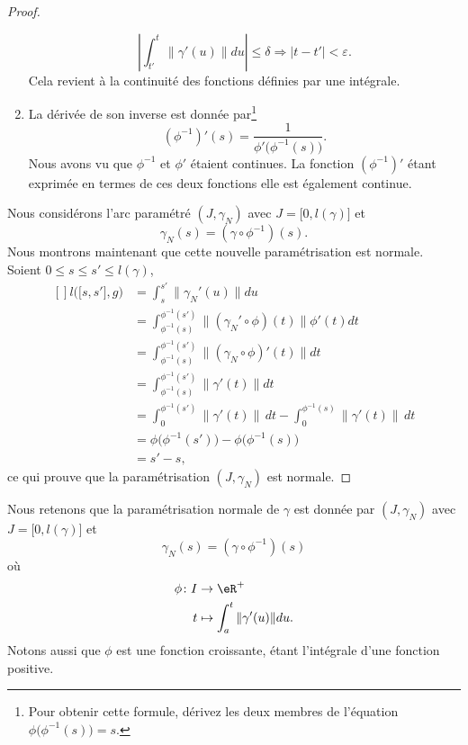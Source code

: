 \begin{proof}
\begin{enumerate}
\begin{equation}
            |   \int_{t'}^t\big\| \gamma'(u) \big\|du  |\leq\delta\Rightarrow | t-t' |<\varepsilon.
        \end{equation}
        Cela revient à la continuité des fonctions définies par une intégrale.
    \item
        La dérivée de son inverse est donnée par\footnote{Pour obtenir cette formule, dérivez les deux membres de l'équation $\phi\big( \phi^{-1}(s) \big)=s$.}
        \begin{equation}
            (\phi^{-1})'(s)=\frac{1}{\phi'\big( \phi^{-1}(s) \big)}.
        \end{equation}
        Nous avons vu que $\phi^{-1}$ et $\phi'$ étaient continues. La fonction $(\phi^{-1})'$ étant exprimée en termes de ces deux fonctions elle est également continue.
\end{enumerate}

Nous considérons l'arc paramétré $(J,\gamma_N)$ avec $J=\mathopen[ 0 , l(\gamma) \mathclose]$ et
\begin{equation}
    \gamma_N(s)=(\gamma\circ\phi^{-1})(s).
\end{equation}
Nous montrons maintenant que cette nouvelle paramétrisation est normale. Soient $0\leq s\leq s'\leq l(\gamma)$,
\begin{equation}
    \begin{aligned}[]
        l\big( \mathopen[ s , s' \mathclose],g \big)&=\int_s^{s'}\big\| \gamma_N'(u) \big\|du\\
        &=\int_{\phi^{-1}(s)}^{\phi^{-1}(s')}\big\| (\gamma_N'\circ\phi)(t) \big\|\phi'(t)dt\\
        &=\int_{\phi^{-1}(s)}^{\phi^{-1}(s')}\big\| (\gamma_N\circ\phi)'(t) \big\|dt\\
        &=\int_{\phi^{-1}(s)}^{\phi^{-1}(s')}\big\| \gamma'(t) \big\|dt\\
        &=\int_{0}^{\phi^{-1}(s')}\big\| \gamma'(t) \big\|\,dt -\int_0^{\phi^{-1}(s)}\big\| \gamma'(t) \big\|\,dt \\
        &=\phi\big( \phi^{-1}(s') \big)-\phi\big( \phi^{-1}(s) \big)\\
        &=s'-s,
    \end{aligned}
\end{equation}
ce qui prouve que la paramétrisation $(J,\gamma_N)$ est normale.
\end{proof}

Nous retenons que la paramétrisation normale de $\gamma$ est donnée par $(J,\gamma_N)$ avec $J=\mathopen[ 0 , l(\gamma) \mathclose]$ et
\begin{equation}        \label{EqFomVPcogammaN}
\gamma_N(s)=(\gamma\circ\phi^{-1})(s)
\end{equation}
où
\begin{equation}        \label{EqFomVPcoordnorm}
\begin{aligned}
    \phi\colon I&\to \eR^+ \\
    t&\mapsto \int_a^t\| \gamma'(u) \|du.
\end{aligned}
\end{equation}
Notons aussi que $\phi$ est une fonction croissante, étant l'intégrale d'une fonction positive.

